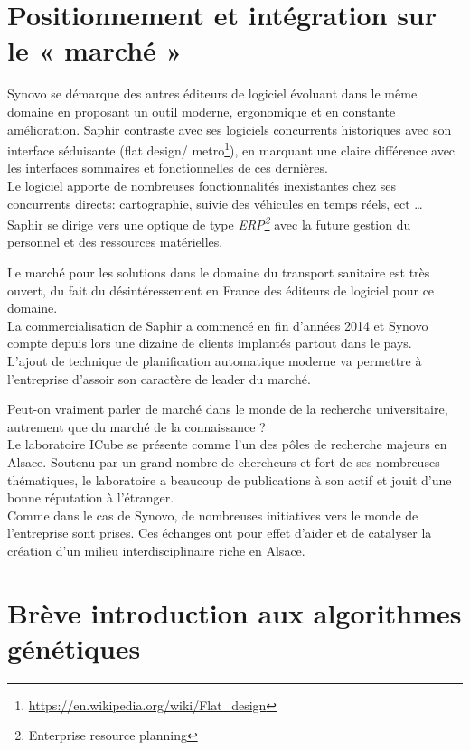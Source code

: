 \documentclass[french, 11pt]{memoir}
\begin{document}
\section{Positionnement et intégration sur le « marché
»}\label{positionnement-et-intuxe9gration-sur-le-marchuxe9}

Synovo se démarque des autres éditeurs de logiciel évoluant dans le même
domaine en proposant un outil moderne, ergonomique et en constante
amélioration. Saphir contraste avec ses logiciels concurrents
historiques avec son interface séduisante (flat design/ metro\footnote{\url{https://en.wikipedia.org/wiki/Flat_design}}), en
marquant une claire différence avec les interfaces sommaires et
fonctionnelles de ces dernières. \\
Le logiciel apporte de nombreuses fonctionnalités inexistantes chez ses
concurrents directs: cartographie, suivie des véhicules en temps réels,
ect \ldots{} Saphir se dirige vers une optique de type \textit{ERP\footnote{Enterprise resource planning}} avec la
future gestion du personnel et des ressources matérielles.

Le marché pour les solutions dans le domaine du transport sanitaire est
très ouvert, du fait du désintéressement en France des éditeurs de
logiciel pour ce domaine. \\
La commercialisation de Saphir a commencé en fin d'années 2014 et Synovo
compte depuis lors une dizaine de clients implantés partout dans le
pays. \\
L'ajout de technique de planification automatique moderne va permettre à
l'entreprise d'assoir son caractère de leader du marché.

\bigskip
Peut-on vraiment parler de marché dans le monde de la recherche
universitaire, autrement que du marché de la connaissance ? \\
Le laboratoire ICube se présente comme l'un des pôles de recherche
majeurs en Alsace. Soutenu par un grand nombre de chercheurs et fort de
ses nombreuses thématiques, le laboratoire a beaucoup de publications à
son actif et jouit d'une bonne réputation à l'étranger. \\
Comme dans le cas de Synovo, de nombreuses initiatives vers le monde de
l'entreprise sont prises. Ces échanges ont pour effet d'aider et de
catalyser la création d'un milieu interdisciplinaire riche en Alsace.

\section{Brève introduction aux algorithmes
génétiques}\label{bruxe8ve-introduction-aux-algorithmes-guxe9nuxe9tiques}
\end{document}
